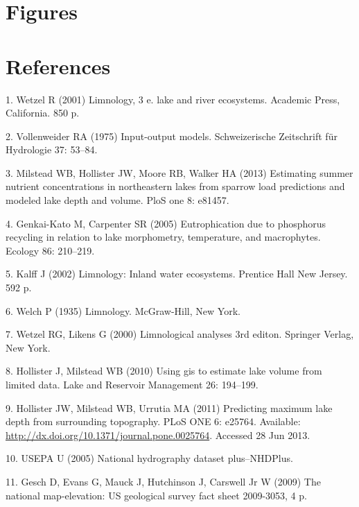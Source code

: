 \documentclass[11pt,]{article}
\begin{document}
\section{Figures}\label{figures}

\section*{References}\label{references}

\hypertarget{refs}{}
\hypertarget{ref-wetzel2001limnology}{}
1. Wetzel R (2001) Limnology, 3 e. lake and river ecosystems. Academic
Press, California. 850 p.

\hypertarget{ref-vollenweider1975input}{}
2. Vollenweider RA (1975) Input-output models. Schweizerische
Zeitschrift für Hydrologie 37: 53--84.

\hypertarget{ref-milstead2013estimating}{}
3. Milstead WB, Hollister JW, Moore RB, Walker HA (2013) Estimating
summer nutrient concentrations in northeastern lakes from sparrow load
predictions and modeled lake depth and volume. PloS one 8: e81457.

\hypertarget{ref-genkai2005eutrophication}{}
4. Genkai-Kato M, Carpenter SR (2005) Eutrophication due to phosphorus
recycling in relation to lake morphometry, temperature, and macrophytes.
Ecology 86: 210--219.

\hypertarget{ref-kalff2002limnology}{}
5. Kalff J (2002) Limnology: Inland water ecosystems. Prentice Hall New
Jersey. 592 p.

\hypertarget{ref-welch1935limnology}{}
6. Welch P (1935) Limnology. McGraw-Hill, New York.

\hypertarget{ref-wetzel2000limnological}{}
7. Wetzel RG, Likens G (2000) Limnological analyses 3rd editon. Springer
Verlag, New York.

\hypertarget{ref-hollister2010volume}{}
8. Hollister J, Milstead WB (2010) Using gis to estimate lake volume
from limited data. Lake and Reservoir Management 26: 194--199.

\hypertarget{ref-hollister2011predicting}{}
9. Hollister JW, Milstead WB, Urrutia MA (2011) Predicting maximum lake
depth from surrounding topography. PLoS ONE 6: e25764. Available:
\url{http://dx.doi.org/10.1371/journal.pone.0025764}. Accessed 28 Jun
2013.

\hypertarget{ref-usepa2005national}{}
10. USEPA U (2005) National hydrography dataset plus--NHDPlus.

\hypertarget{ref-gesch2009national}{}
11. Gesch D, Evans G, Mauck J, Hutchinson J, Carswell Jr W (2009) The
national map-elevation: US geological survey fact sheet 2009-3053, 4 p.
\end{document}
